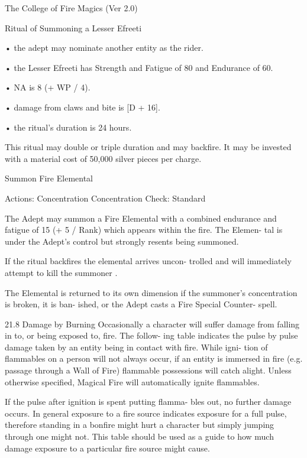 \begin{Chapter}{The College of Fire Magics (Ver 2.0)}
\begin{ritual}[R-3]{Ritual of Summoning a Lesser Efreeti }
\begin{effects}
•  the  adept  may  nominate  another  entity  as  the 
rider.  

• the Lesser Efreeti has Strength and Fatigue of 80 
and Endurance of 60.  

• NA is 8 (+ WP / 4).  

• damage from claws and bite is [D + 16].  

• the ritual’s duration is 24 hours. 

This  ritual  may  double  or  triple  duration  and  may 
backfire. It may be invested with a material cost of 
50,000 silver pieces per charge. 

\end{effects}
\end{ritual}

\begin{ritual}[R-4]{Summon Fire Elemental }

Actions: Concentration 
Concentration Check: Standard 
\begin{effects}
The  Adept may summon a Fire Elemental 
with a combined endurance and fatigue of 15 (+ 5 / 
Rank)  which  appears  within  the  fire.  The  Elemen-
tal is under the Adept’s control but strongly resents 
being summoned. 

If  the  ritual backfires  the  elemental  arrives  uncon-
trolled  and  will  immediately  attempt  to  kill  the 
summoner .

The  Elemental  is  returned  to  its  own  dimension  if 
the  summoner’s  concentration is broken,  it  is ban-
ished,  or  the  Adept  casts  a  Fire  Special  Counter-
spell. 


21.8 Damage by Burning 
Occasionally  a  character  will  suffer  damage  from 
falling in to, or being exposed to, fire. The follow-
ing table indicates the pulse by pulse damage taken 
by an entity being in contact with fire. While igni-
tion  of  flammables  on  a  person  will  not  always 
occur, if an entity is immersed in fire (e.g. passage 
through a Wall of Fire) flammable possessions will 
catch  alight.  Unless  otherwise  specified,  Magical 
Fire will automatically ignite flammables. 

If  the  pulse  after  ignition is  spent putting  flamma-
bles  out,  no  further  damage  occurs.  In  general 
exposure  to  a  fire  source  indicates  exposure  for  a 
full  pulse,  therefore  standing  in  a  bonfire  might 
hurt  a  character  but  simply  jumping  through  one 
might not. This table should be used as a guide to 
how  much  damage  exposure  to  a  particular  fire 
source might cause. 


\end{effects}
\end{ritual}
\end{Chapter}
